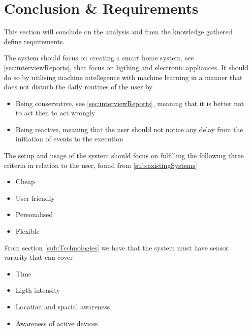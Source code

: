 \section{Conclusion \& Requirements}
This section will conclude on the analysis and from the knowledge gathered define requirements.

The system should focus on creating a smart home system, see \cref{sec:interviewReports}, that focus on ligthing and electronic appliances. It should do so by utilising machine intellegence with machine learning in a manner that does not disturb the daily routines of the user by
\begin{itemize}
  \item Being conservative, see \cref{sec:interviewReports}, meaning that it is better not to act then to act wrongly
  \item Being reactive, meaning that the user should not notice any delay from the initiation of events to the execution
\end{itemize}

The setup and usage of the system should focus on fulfilling the following three criteria in relation to the user, found from \cref{sub:existingSystems}
\begin{itemize}
  \item Cheap
  \item User friendly
  \item Personalised
  \item Flexible
\end{itemize}

From section \cref{sub:Technologies} we have that the system must have sensor vararity that can cover
\begin{itemize}
  \item Time
  \item Ligth intensity
  \item Location and spacial awareness
  \item Awareness of active devices
\end{itemize}